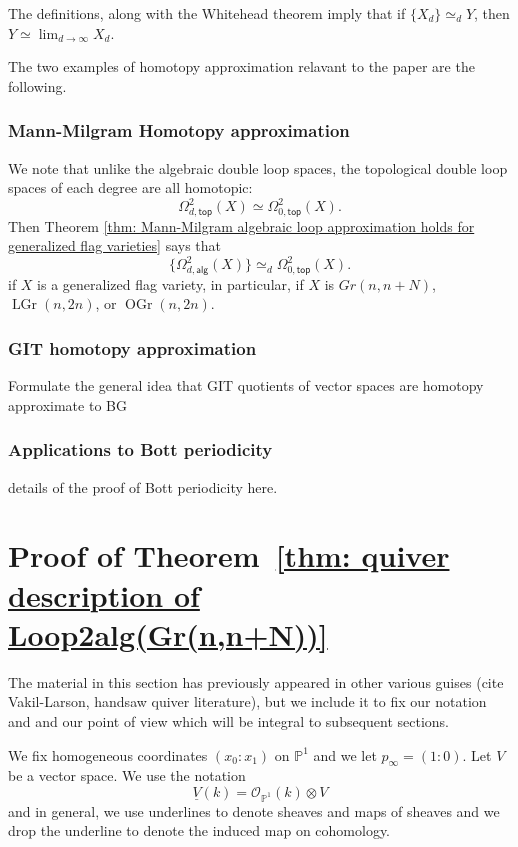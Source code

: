 \documentclass{amsart}
\theoremstyle{definition}
\newcommand{\PP}{\mathbb{P}}
\newcommand{\OO}{\mathcal{O}}
\newcommand{\UL}[1]{\underline{#1}}
\newcommand{\alg}{\mathsf{alg}}
\renewcommand{\top}{\mathsf{top}}
\newcommand{\LGr}{\operatorname{LGr}}
\newcommand{\OGr}{\operatorname{OGr}}
\newcommand{\LoopTwo}{\Omega^{2}_{d,\alg}}
\newcommand{\LoopTwoTop}{\Omega^{2}_{d,\top}}
\newcommand{\homotopyeq}{\simeq}
\begin{document}
The definitions, along with the Whitehead theorem imply that if
$\{X_{d} \}\homotopyeq_{d} Y$, then $Y\homotopyeq \lim_{d\to
\infty}X_{d}$.

The two examples of homotopy approximation relavant to the paper are
the following.
\subsubsection{Mann-Milgram Homotopy approximation}\label{subsubsec:
Mann-Milgram homot approx}
We note that unlike the algebraic double loop spaces, the topological
double loop spaces of each degree are all homotopic:
\[
\LoopTwoTop (X)\homotopyeq \Omega^{2}_{0,\top}(X).
\]
Then Theorem \ref{thm: Mann-Milgram algebraic loop approximation
holds for generalized flag varieties} says that 
\[
\{\LoopTwo (X) \}\homotopyeq_{d}  \Omega^{2}_{0,\top}(X).
\]
if $X$ is a generalized flag variety, in particular, if $X$ is
$Gr(n,n+N)$, $\LGr(n,2n)$, or $\OGr(n,2n)$.

\subsubsection{GIT homotopy approximation}\label{subsubsec: GIT
homotopy approx}

Formulate the general idea that GIT quotients of vector spaces are homotopy
approximate to BG

\subsubsection{Applications to Bott periodicity}\label{subsubsec:
applications to Bott perioditicy}

details of the proof of Bott periodicity here. 


\section{Proof of Theorem~\ref{thm: quiver description of
Loop2alg(Gr(n,n+N))}}\label{sec: proof of Gr(n,n+N) thm}

The material in this section has previously appeared in other various
guises ({\color{red}cite Vakil-Larson, handsaw quiver literature}), but we include
it to fix our notation and and our point of view which will be integral to
subsequent sections. 



We fix homogeneous coordinates $(x_{0}:x_{1})$ on $\PP^{1}$ and we let
$p_{\infty }=(1:0)$. Let $V$ be a vector space. We use the notation
\[
\UL{V}(k) = \OO_{\PP^{1}}(k)\otimes V
\]
and in general, we use underlines to denote sheaves and maps of
sheaves and we drop the underline to denote the induced map on cohomology.
\end{document}
